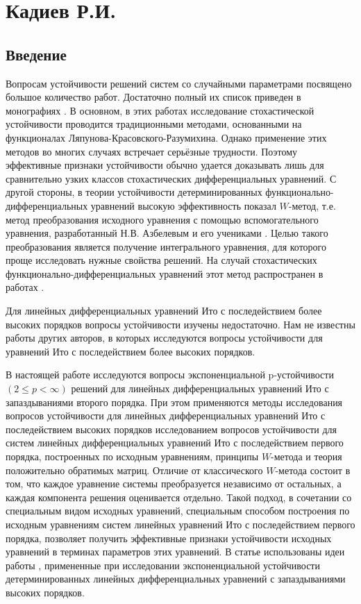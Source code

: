 
\chapter{Кадиев Р.И.}




\section{Введение}

Вопросам устойчивости решений систем со случайными параметрами посвящено большое количество работ.
Достаточно полный их список приведен в монографиях \cite{kri-bib-1, kri-bib-2, kri-bib-3, kri-bib-4}.
В основном, в этих работах исследование стохастической устойчивости проводится традиционными методами, основанными на функционалах Ляпунова-Красовского-Разумихина.
Однако применение этих методов во многих случаях встречает серьёзные трудности.
Поэтому эффективные признаки устойчивости обычно удается доказывать лишь для сравнительно узких классов стохастических дифференциальных уравнений.
С другой стороны, в теории устойчивости детерминированных функционально-дифференциальных уравнений высокую эффективность показал  $W$-метод, т.е. метод преобразования исходного уравнения с помощью вспомогательного уравнения, разработанный Н.В. Азбелевым и его учениками \cite{kri-bib-5, kri-bib-6, kri-bib-7, kri-bib-8}.
Целью такого преобразования является получение интегрального уравнения, для которого проще исследовать нужные свойства решений.
На случай стохастических функционально-дифференциальных уравнений этот метод распространен в работах \cite{kri-bib-9, kri-bib-10, kri-bib-11, kri-bib-12, kri-bib-13, kri-bib-14, kri-bib-15}.

Для линейных дифференциальных уравнений Ито с последействием более высоких порядков вопросы устойчивости изучены недостаточно.
Нам не известны работы других авторов, в которых исследуются вопросы устойчивости для уравнений Ито с последействием более высоких порядков.

В настоящей работе исследуются вопросы экспоненциальной p-устойчивости $(2 \le p < \infty)$ решений для линейных дифференциальных уравнений Ито с запаздываниями второго порядка.
При этом применяются методы исследования вопросов устойчивости для линейных дифференциальных уравнений Ито с последействием высоких порядков исследованием вопросов устойчивости для систем линейных дифференциальных уравнений Ито с последействием первого порядка, построенных по исходным уравнениям, принципы  $W$-метода и теория положительно обратимых матриц.
Отличие от классического $W$-метода состоит в том, что каждое уравнение системы преобразуется независимо от остальных, а каждая компонента решения оценивается отдельно.
Такой подход, в сочетании со специальным видом исходных уравнений, специальным способом построения по исходным уравнениям систем линейных уравнений Ито с последействием первого порядка, позволяет получить эффективные признаки устойчивости исходных уравнений в терминах параметров этих уравнений.
В статье использованы идеи работы \cite{kri-bib-16}, примененные при исследовании экспоненциальной устойчивости детерминированных линейных дифференциальных уравнений с запаздываниями высоких порядков.


